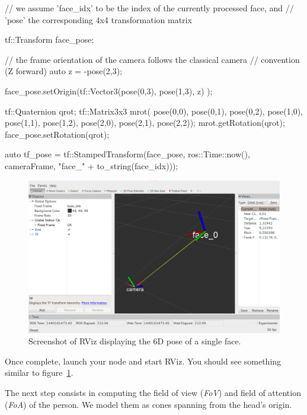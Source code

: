 \documentclass{instructions}
\begin{document}
\begin{cppcode}

// we assume 'face_idx' to be the index of the currently processed face, and
// 'pose' the corresponding 4x4 transformation matrix

tf::Transform face_pose;

// the frame orientation of the camera follows the classical camera
// convention (Z forward)
auto z = -pose(2,3);

face_pose.setOrigin(tf::Vector3(pose(0,3),
                                pose(1,3),
                                z) );

tf::Quaternion qrot;
tf::Matrix3x3 mrot(
        pose(0,0), pose(0,1), pose(0,2),
        pose(1,0), pose(1,1), pose(1,2),
        pose(2,0), pose(2,1), pose(2,2));
mrot.getRotation(qrot);
face_pose.setRotation(qrot);

auto tf_pose = tf::StampedTransform(face_pose, 
                                    ros::Time::now(), 
                                    cameraFrame,
                                    "face_" + to_string(face_idx)));
\end{cppcode}

\begin{figure}[h!]
    \centering
    \includegraphics[width=0.9\linewidth]{figs/rviz}
    \caption{Screenshot of RViz displaying the 6D
    pose of a single face.}
    \label{rviz}
\end{figure}

Once complete, launch your node and start RViz. You should see something similar
to figure~\ref{rviz}.



The next step consists in computing the field of view ({\it FoV}) and field of
attention ({\it FoA}) of the person. We model them as cones spanning from the
head's origin.
\end{document}
